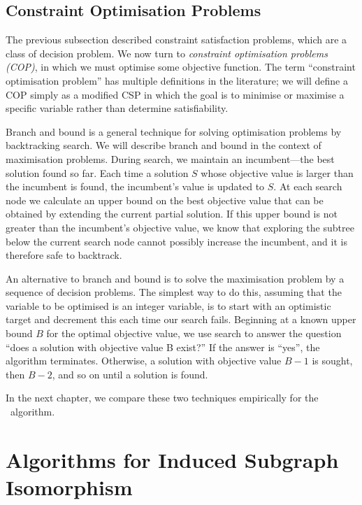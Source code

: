 \subsection{Constraint Optimisation Problems}

The previous subsection described constraint satisfaction problems, which are a
class of decision problem. We now turn to \emph{constraint optimisation
problems (COP)}, in which we must optimise some objective function.  The term
``constraint optimisation problem'' has multiple definitions in the literature;
we will define a COP simply as a modified CSP in which the goal is to minimise
or maximise a specific variable rather than determine satisfiability.

Branch and bound \citep{land2010automatic} is a general technique for solving
optimisation problems by backtracking search. We will describe branch and bound
in the context of maximisation problems.  
During search, we maintain an incumbent---the best solution found so far. Each
time a solution $S$ whose objective value is larger than the incumbent is found,
the incumbent’s value is updated to $S$. At each search node we calculate an
upper bound on the best objective value that can be obtained by extending the
current partial solution. If this upper bound is not greater than the
incumbent’s objective value, we know that exploring the subtree below the
current search node cannot possibly increase the incumbent, and it is therefore
safe to backtrack.

An alternative to branch and bound is to solve the maximisation problem by a
sequence of decision problems.  The simplest way to do this, assuming that the
variable to be optimised is an integer variable, is to start with an optimistic
target and decrement this each time our search fails.  Beginning at a known
upper bound $B$ for the optimal objective value, we use search to answer the
question “does a solution with objective value B exist?” If the answer is
“yes”, the algorithm terminates. Otherwise, a solution with objective value
$B-1$ is sought, then $B-2$, and so on until a solution is found.

In the next chapter, we compare these two techniques empirically for
the \McSplit\ algorithm.

\section{Algorithms for Induced Subgraph Isomorphism}\label{sec:si-algorithms}

